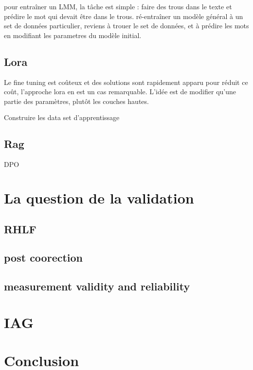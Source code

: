 \documentclass[
  letterpaper,
  DIV=11,
  numbers=noendperiod]{scrreprt}
\begin{document}
pour entraîner un LMM, la tâche est simple : faire des trous dans le
texte et prédire le mot qui devait être dans le trous. ré-entraîner un
modèle général à un set de données particulier, reviens à trouer le set
de données, et à prédire les mots en modifiant les parametres du modèle
initial.

\subsection{Lora}\label{lora}

Le fine tuning est coûteux et des solutions sont rapidement apparu pour
réduit ce coût, l'approche lora en est un cas remarquable. L'idée est de
modifier qu'une partie des paramètres, plutôt les couches hautes.

Construire les data set d'apprentissage

\subsection{Rag}\label{rag}

DPO

\section{La question de la
validation}\label{la-question-de-la-validation}

\subsection{RHLF}\label{rhlf}

\subsection{post coorection}\label{post-coorection}

\subsection{measurement validity and
reliability}\label{measurement-validity-and-reliability}

\section{IAG}\label{iag}

\section{Conclusion}\label{conclusion-12}
\end{document}
